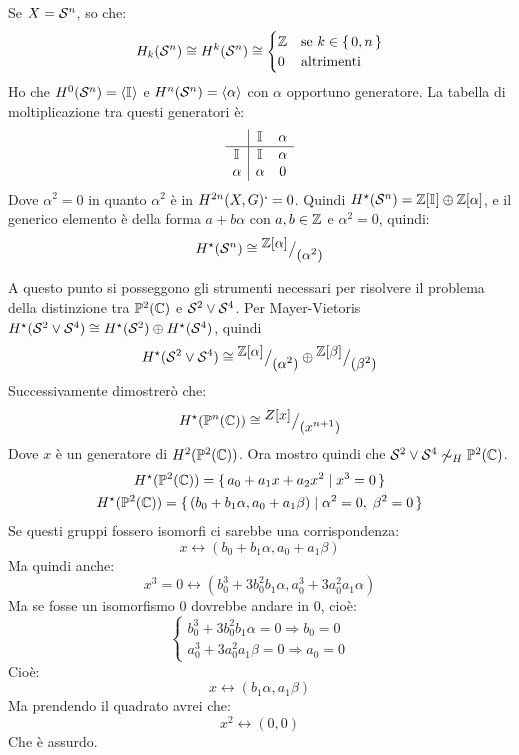 \begin{example}
  Se $ X = \mathcal{S}^{n} $, so che:
  \[
    H_k(\mathcal{S}^{n}) \cong H^k(\mathcal{S}^{n}) \cong
    \begin{cases}
      \mathbb{Z} & \text{se } k \in \set{0,n} \\
      0 & \text{altrimenti}
    \end{cases}
  \]
  Ho che $ H^0(\mathcal{S}^{n}) = \langle\mathbb{I}_{}\rangle $ e $ H^n(\mathcal{S}^{n}) = \langle\alpha\rangle $ con $ \alpha $ opportuno
  generatore. La tabella di moltiplicazione tra questi generatori è:
  \[
    \begin{array}{c|cc}
      {} & \mathbb{I}_{} & \alpha \\ \hline
      \mathbb{I}_{} & \mathbb{I}_{} & \alpha \\
      \alpha  & \alpha & 0 \\
    \end{array}
  \]
  Dove $ \alpha^2 = 0 $ in quanto $ \alpha^2 $ è in $ H^{2n}(X, G) `= 0 $.
  Quindi $ H^\star(\mathcal{S}^{n}) = \mathbb{Z}[\mathbb{I}_{}] \oplus \mathbb{Z}[\alpha] $, e il generico elemento è
  della forma $ a + b \alpha $ con $ a,b \in \mathbb{Z} $ e $ \alpha^2 = 0 $, quindi:
  \[
    H^\star(\mathcal{S}^{n}) \cong {^{\textstyle \mathbb{Z}[\alpha]}\big/_{\textstyle (\alpha^2)}}
  \]
\end{example}
\begin{example}
  A questo punto si posseggono gli strumenti necessari per risolvere il problema della
  distinzione tra $ \mathbb{P}^{2} (\mathbb{C}) $ e $ \mathcal{S}^{2} \vee \mathcal{S}^{4} $.
  Per Mayer-Vietoris $ H^\star(\mathcal{S}^{2} \vee \mathcal{S}^{4}) \cong H^\star(\mathcal{S}^{2}) \oplus H^\star(\mathcal{S}^{4}) $, quindi
  \[
    H^\star(\mathcal{S}^{2} \vee \mathcal{S}^{4}) \cong {^{\textstyle \mathbb{Z}[\alpha]}\big/_{\textstyle (\alpha^2)}} \oplus {^{\textstyle \mathbb{Z}[\beta]}\big/_{\textstyle (\beta^2)}}
  \]
  Successivamente dimostrerò che:
  \[
    H^\star(\mathbb{P}^{n} (\mathbb{C})) \cong {^{\textstyle Z[x]}\big/_{\textstyle (x^{n+1})}}
  \]
  Dove $ x $ è un generatore di $ H^{2}(\mathbb{P}^{2} (\mathbb{C})) $.
  Ora mostro quindi che $ \mathcal{S}^{2} \vee \mathcal{S}^{4} \not \sim_H \mathbb{P}^{2} (\mathbb{C}) $.
  \begin{gather*}
    H^\star(\mathbb{P}^{2} (\mathbb{C})) = \set{a_0 + a_1 x + a_2 x^2 | x^3 = 0} \\
    H^\star(\mathbb{P}^{2} (\mathbb{C})) = \set{(b_0 + b_1 \alpha, a_0 + a_1 \beta) | \alpha^2 = 0, \; \beta^2 = 0}
  \end{gather*}
  Se questi gruppi fossero isomorfi ci sarebbe una corrispondenza:
  \[
    x \leftrightarrow (b_0 + b_1 \alpha, a_0 + a_1 \beta)
  \]
  Ma quindi anche:
  \[
    x^3 = 0 \leftrightarrow (b_0^3 + 3 b_0^2 b_1 \alpha, a_0^3 + 3 a_0^2 a_1 \alpha)
  \]
  Ma se fosse un isomorfismo $ 0 $ dovrebbe andare in $ 0 $, cioè:
  \[
    \begin{cases}
      b_0^3 + 3 b_0^2 b_1 \alpha = 0 \Rightarrow b_0 = 0  \\
      a_0^3 + 3 a_0^2 a_1 \beta = 0 \Rightarrow a_0 = 0
    \end{cases}
  \]
  Cioè:
  \[
    x \leftrightarrow  (b_1 \alpha, a_1 \beta)
  \]
  Ma prendendo il quadrato avrei che:
  \[
    x^2 \leftrightarrow  (0, 0)
  \]
  Che è assurdo.
\end{example}

